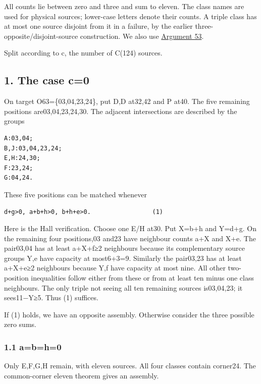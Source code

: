 \documentclass[
  10pt,
]{article}
\begin{document}
All counts lie between zero and three and sum to eleven. The class names
are used for physical sources; lower-case letters denote their counts. A
triple class has at most one source disjoint from it in a failure, by
the earlier three-opposite/disjoint-source construction. We also use
\protect\hyperlink{arg-53}{Argument 53}.

Split according to c, the number of C(124) sources.

\hypertarget{the-case-c0}{%
\subsection*{1. The case c=0}\label{the-case-c0}}

On target O63=\{03,04,23,24\}, put D,D at32,42 and P at40. The five
remaining positions are03,04,23,24,30. The adjacent intersections are
described by the groups

\begin{verbatim}
A:03,04;
B,J:03,04,23,24;
E,H:24,30;
F:23,24;
G:04,24.
\end{verbatim}

These five positions can be matched whenever

\begin{verbatim}
d+g>0, a+b+h>0, b+h+e>0.                 (1)
\end{verbatim}

Here is the Hall verification. Choose one E/H at30. Put X=b+h and Y=d+g.
On the remaining four positions,03 and23 have neighbour counts a+X and
X+e. The pair03,04 has at least a+X+f≥2 neighbours because its
complementary source groups Y,e have capacity at most6+3=9. Similarly
the pair03,23 has at least a+X+e≥2 neighbours because Y,f have capacity
at most nine. All other two-position inequalities follow either from
these or from at least ten minus one class neighbours. The only triple
not seeing all ten remaining sources is03,04,23; it sees11−Y≥5. Thus (1)
suffices.

If (1) holds, we have an opposite assembly. Otherwise consider the three
possible zero sums.

\hypertarget{abh0}{%
\subsubsection*{1.1 a=b=h=0}\label{abh0}}

Only E,F,G,H remain, with eleven sources. All four classes contain
corner24. The common-corner eleven theorem gives an assembly.
\end{document}
